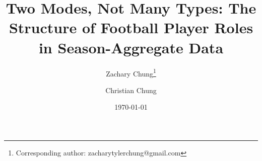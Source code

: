 \ifreview
  \usepackage{setspace}
  \doublespacing
  \usepackage{lineno}
  \linenumbers
\fi

\ifreview
  \newcommand{\repourl}{[repository URL withheld for blind review]}
\else
  \newcommand{\repourl}{\url{https://github.com/ZacharyTChung/pl-player-profiling}}
\fi

\title{Two Modes, Not Many Types: The Structure of Football Player Roles in
Season-Aggregate Data}

\ifreview
  \author{}
  \date{}
\else
  \author{Zachary Chung\thanks{Corresponding author: zacharytylerchung@gmail.com} \and Christian Chung}
  \date{\today}
\fi
